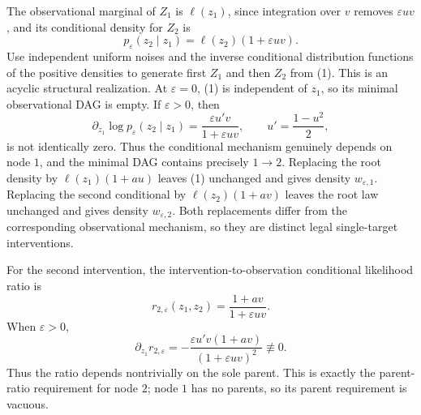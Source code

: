 The observational marginal of \(Z_1\) is \(\ell(z_1)\), since integration over \(v\) removes \(\varepsilon uv\), and its conditional density for \(Z_2\) is
\[
 p_{\varepsilon}(z_2\mid z_1)=\ell(z_2)(1+\varepsilon uv).
 \tag{1}
\]
Use independent uniform noises and the inverse conditional distribution functions of the positive densities to generate first \(Z_1\) and then \(Z_2\) from (1).  This is an acyclic structural realization.  At \(\varepsilon=0\), (1) is independent of \(z_1\), so its minimal observational DAG is empty.  If \(\varepsilon>0\), then
\[
 \partial_{z_1}\log p_{\varepsilon}(z_2\mid z_1)
 =\frac{\varepsilon u'v}{1+\varepsilon uv},
 \qquad u'=\frac{1-u^2}{2},
\]
is not identically zero.  Thus the conditional mechanism genuinely depends on node \(1\), and the minimal DAG contains precisely \(1\to2\).  Replacing the root density by \(\ell(z_1)(1+au)\) leaves (1) unchanged and gives density \(w_{\varepsilon,1}\).  Replacing the second conditional by \(\ell(z_2)(1+av)\) leaves the root law unchanged and gives density \(w_{\varepsilon,2}\).  Both replacements differ from the corresponding observational mechanism, so they are distinct legal single-target interventions.

For the second intervention, the intervention-to-observation conditional likelihood ratio is
\[
 r_{2,\varepsilon}(z_1,z_2)
 =\frac{1+av}{1+\varepsilon uv}.
\]
When \(\varepsilon>0\),
\[
 \partial_{z_1}r_{2,\varepsilon}
 =-\frac{\varepsilon u'v(1+av)}{(1+\varepsilon uv)^2}
 \not\equiv0.
\]
Thus the ratio depends nontrivially on the sole parent.  This is exactly the parent-ratio requirement for node \(2\); node \(1\) has no parents, so its parent requirement is vacuous.

